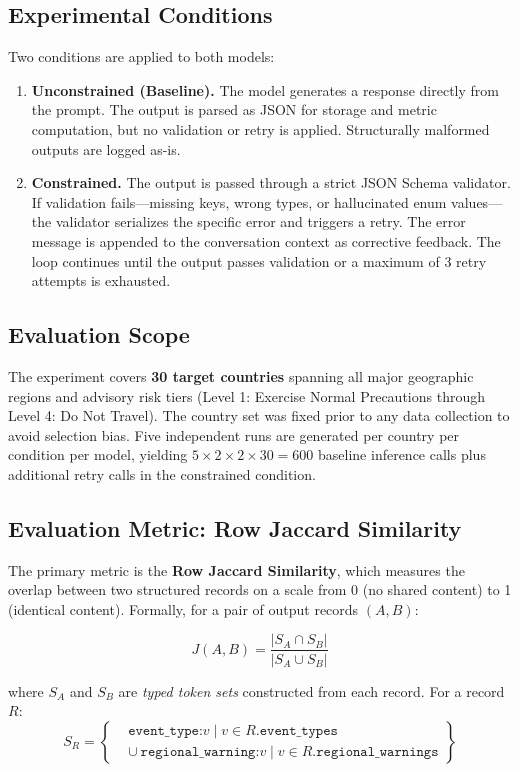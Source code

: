 \documentclass[sigconf]{acmart}
\begin{document}
\subsection{Experimental Conditions}

Two conditions are applied to both models:

\begin{enumerate}
  \item \textbf{Unconstrained (Baseline).} The model generates a response directly from the prompt. The output is parsed as JSON for storage and metric computation, but no validation or retry is applied. Structurally malformed outputs are logged as-is.
  \item \textbf{Constrained.} The output is passed through a strict JSON Schema validator. If validation fails---missing keys, wrong types, or hallucinated enum values---the validator serializes the specific error and triggers a retry. The error message is appended to the conversation context as corrective feedback. The loop continues until the output passes validation or a maximum of 3 retry attempts is exhausted.
\end{enumerate}

\subsection{Evaluation Scope}

The experiment covers \textbf{30 target countries} spanning all major geographic regions and advisory risk tiers (Level 1: Exercise Normal Precautions through Level 4: Do Not Travel). The country set was fixed prior to any data collection to avoid selection bias. Five independent runs are generated per country per condition per model, yielding $5 \times 2 \times 2 \times 30 = 600$ baseline inference calls plus additional retry calls in the constrained condition.

\subsection{Evaluation Metric: Row Jaccard Similarity}

The primary metric is the \textbf{Row Jaccard Similarity}, which measures the overlap between two structured records on a scale from 0 (no shared content) to 1 (identical content). Formally, for a pair of output records $(A, B)$:

\[
  J(A, B) = \frac{|S_A \cap S_B|}{|S_A \cup S_B|}
\]

where $S_A$ and $S_B$ are \emph{typed token sets} constructed from each record. For a record $R$:
\[
S_R = \left\{
  \begin{aligned}
    &\texttt{event\_type:}v \mid v \in R.\texttt{event\_types} \\
    &\cup\ \texttt{regional\_warning:}v \mid v \in R.\texttt{regional\_warnings}
  \end{aligned}
\right\}
\]
\end{document}
